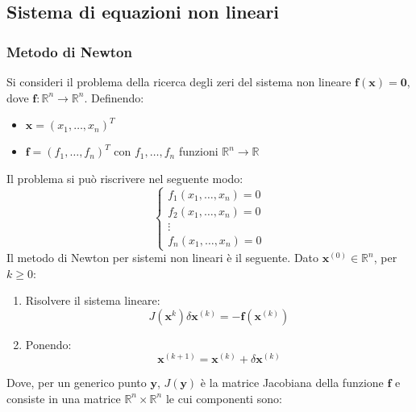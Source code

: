 \subsection{Sistema di equazioni non lineari}

\subsubsection{Metodo di Newton}

Si consideri il problema della ricerca degli zeri del sistema non lineare $\mathbf{f}\left(\mathbf{x}\right) = \mathbf{0}$, dove $\mathbf{f}: \mathbb{R}^{n} \rightarrow \mathbb{R}^{n}$. Definendo: 
\begin{itemize}
	\item $\mathbf{x} = \left(x_{1}, \dots, x_{n}\right)^{T}$
	\item $\mathbf{f} = \left(f_{1}, \dots, f_{n}\right)^{T}$ con $f_{1}, \dots, f_{n}$ funzioni $\mathbb{R}^{n} \rightarrow \mathbb{R}$
\end{itemize}
Il problema si può riscrivere nel seguente modo:
\begin{equation*}
	\begin{cases}
		f_{1}\left(x_{1}, \dots, x_{n}\right) = 0 \\
		f_{2}\left(x_{1}, \dots, x_{n}\right) = 0 \\
		\vdots \\
		f_{n}\left(x_{1}, \dots, x_{n}\right) = 0
	\end{cases}
\end{equation*}
Il metodo di Newton per sistemi non lineari è il seguente. Dato $\mathbf{x}^{\left(0\right)} \in \mathbb{R}^{n}$, per $k \ge 0$:
\begin{enumerate}
	\item Risolvere il sistema lineare:
	\begin{equation*}
		J\left(\mathbf{x}^{k}\right)\delta\mathbf{x}^{\left(k\right)} = -\mathbf{f}\left(\mathbf{x}^{\left(k\right)}\right)
	\end{equation*}
	
	\item Ponendo:
	\begin{equation*}
		\mathbf{x}^{\left(k+1\right)} = \mathbf{x}^{\left(k\right)} + \delta\mathbf{x}^{\left(k\right)}
	\end{equation*}
\end{enumerate}
Dove, per un generico punto $\mathbf{y}$, $J\left(\mathbf{y}\right)$ è la matrice Jacobiana della funzione $\mathbf{f}$ e consiste in una matrice $\mathbb{R}^{n} \times \mathbb{R}^{n}$ le cui componenti sono:
